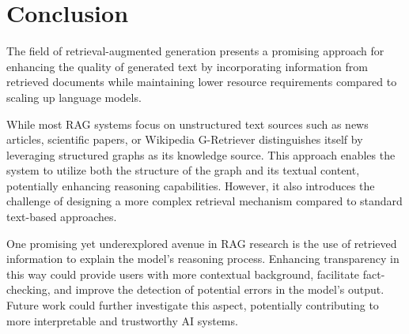 \section{Conclusion}

The field of retrieval-augmented generation presents a promising approach for enhancing the quality of generated text by incorporating information from retrieved documents while maintaining lower resource requirements compared to scaling up language models.

While most RAG systems focus on unstructured text sources \textemdash such as news articles, scientific papers, or Wikipedia \textemdash G-Retriever distinguishes itself by leveraging structured graphs as its knowledge source.
This approach enables the system to utilize both the structure of the graph and its textual content, potentially enhancing reasoning capabilities.
However, it also introduces the challenge of designing a more complex retrieval mechanism compared to standard text-based approaches.

One promising yet underexplored avenue in RAG research is the use of retrieved information to explain the model's reasoning process.
Enhancing transparency in this way could provide users with more contextual background, facilitate fact-checking, and improve the detection of potential errors in the model's output.
Future work could further investigate this aspect, potentially contributing to more interpretable and trustworthy AI systems.
